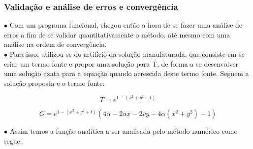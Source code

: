 \documentclass[xcolor=dvipsnames,10pt,aspectratio=169]{beamer}
\begin{document}
	\begin{frame}
\frametitle{Validação e análise de erros e convergência}
\begin{minipage}[h!]{0.77\textwidth}
$\bullet$ Com um programa funcional, chegou então a hora de se fazer uma análise de erros a fim de se validar quantitativamente o método. até mesmo com uma análise na ordem de convergência.  \\
$\bullet$ Para isso, utilizou-se do artifício da solução manufaturada, que consiste em se criar um termo fonte e propor uma solução para T, de forma a se desenvolver uma solução exata para a equação quando acrescida deste termo fonte. Seguem a solução proposta e o termo fonte:

\begin{equation}
T = e ^{1 - (x^2 + y^2 + t)}
\end{equation}

\begin{equation}
G = e^{1 - (x^2 + y^2 + t)} \left( 4 \alpha - 2 u x - 2 v y - 4 \alpha (x^2 + y^2) - 1 \right)
\end{equation}

$\bullet$ Assim temos a função analítica a ser analisada pelo método numérico como segue:



\end{minipage}
\end{frame}
\end{document}
